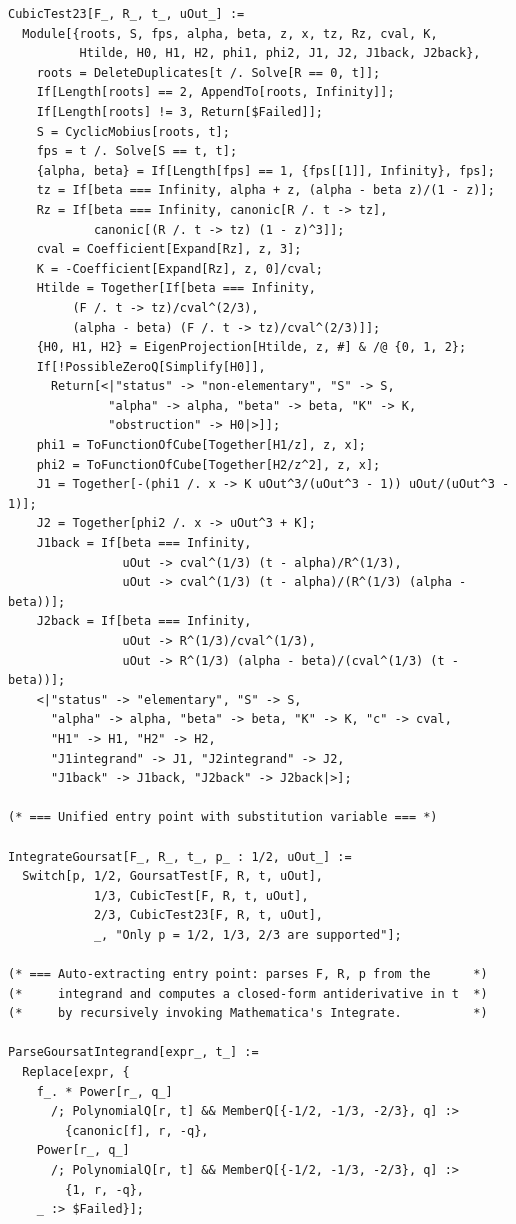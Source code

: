 \documentclass[11pt,a4paper]{article}
\theoremstyle{plain}
\theoremstyle{definition}
\theoremstyle{remark}
\begin{document}
\begin{lstlisting}
CubicTest23[F_, R_, t_, uOut_] :=
  Module[{roots, S, fps, alpha, beta, z, x, tz, Rz, cval, K,
          Htilde, H0, H1, H2, phi1, phi2, J1, J2, J1back, J2back},
    roots = DeleteDuplicates[t /. Solve[R == 0, t]];
    If[Length[roots] == 2, AppendTo[roots, Infinity]];
    If[Length[roots] != 3, Return[$Failed]];
    S = CyclicMobius[roots, t];
    fps = t /. Solve[S == t, t];
    {alpha, beta} = If[Length[fps] == 1, {fps[[1]], Infinity}, fps];
    tz = If[beta === Infinity, alpha + z, (alpha - beta z)/(1 - z)];
    Rz = If[beta === Infinity, canonic[R /. t -> tz],
            canonic[(R /. t -> tz) (1 - z)^3]];
    cval = Coefficient[Expand[Rz], z, 3];
    K = -Coefficient[Expand[Rz], z, 0]/cval;
    Htilde = Together[If[beta === Infinity,
         (F /. t -> tz)/cval^(2/3),
         (alpha - beta) (F /. t -> tz)/cval^(2/3)]];
    {H0, H1, H2} = EigenProjection[Htilde, z, #] & /@ {0, 1, 2};
    If[!PossibleZeroQ[Simplify[H0]],
      Return[<|"status" -> "non-elementary", "S" -> S,
              "alpha" -> alpha, "beta" -> beta, "K" -> K,
              "obstruction" -> H0|>]];
    phi1 = ToFunctionOfCube[Together[H1/z], z, x];
    phi2 = ToFunctionOfCube[Together[H2/z^2], z, x];
    J1 = Together[-(phi1 /. x -> K uOut^3/(uOut^3 - 1)) uOut/(uOut^3 - 1)];
    J2 = Together[phi2 /. x -> uOut^3 + K];
    J1back = If[beta === Infinity,
                uOut -> cval^(1/3) (t - alpha)/R^(1/3),
                uOut -> cval^(1/3) (t - alpha)/(R^(1/3) (alpha - beta))];
    J2back = If[beta === Infinity,
                uOut -> R^(1/3)/cval^(1/3),
                uOut -> R^(1/3) (alpha - beta)/(cval^(1/3) (t - beta))];
    <|"status" -> "elementary", "S" -> S,
      "alpha" -> alpha, "beta" -> beta, "K" -> K, "c" -> cval,
      "H1" -> H1, "H2" -> H2,
      "J1integrand" -> J1, "J2integrand" -> J2,
      "J1back" -> J1back, "J2back" -> J2back|>];

(* === Unified entry point with substitution variable === *)

IntegrateGoursat[F_, R_, t_, p_ : 1/2, uOut_] :=
  Switch[p, 1/2, GoursatTest[F, R, t, uOut],
            1/3, CubicTest[F, R, t, uOut],
            2/3, CubicTest23[F, R, t, uOut],
            _, "Only p = 1/2, 1/3, 2/3 are supported"];

(* === Auto-extracting entry point: parses F, R, p from the      *)
(*     integrand and computes a closed-form antiderivative in t  *)
(*     by recursively invoking Mathematica's Integrate.          *)

ParseGoursatIntegrand[expr_, t_] :=
  Replace[expr, {
    f_. * Power[r_, q_]
      /; PolynomialQ[r, t] && MemberQ[{-1/2, -1/3, -2/3}, q] :>
        {canonic[f], r, -q},
    Power[r_, q_]
      /; PolynomialQ[r, t] && MemberQ[{-1/2, -1/3, -2/3}, q] :>
        {1, r, -q},
    _ :> $Failed}];


\end{lstlisting}
\end{document}
